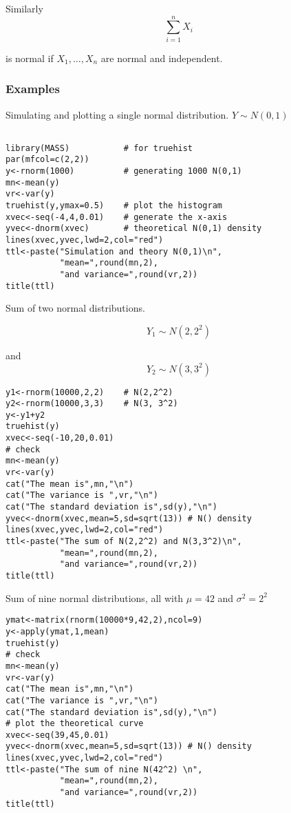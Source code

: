 \documentclass[12pt,a4paper]{article}
\theoremstyle{regla}
\theoremstyle{remark}
\theoremstyle{definition}
\theoremstyle{nonumberbreak}
\begin{document}
Similarly $$\sum_{i=1}^{n} X_i $$

is normal if $X_1 , \ldots , X_n$ are normal and independent.
\subsubsection{Examples}
\begin{xmpl}
Simulating and plotting a single normal distribution.
$Y \sim N(0,1)$

\begin{lstlisting}

library(MASS)           # for truehist
par(mfcol=c(2,2))       
y<-rnorm(1000)          # generating 1000 N(0,1)
mn<-mean(y)
vr<-var(y)
truehist(y,ymax=0.5)    # plot the histogram
xvec<-seq(-4,4,0.01)    # generate the x-axis
yvec<-dnorm(xvec)       # theoretical N(0,1) density
lines(xvec,yvec,lwd=2,col="red")
ttl<-paste("Simulation and theory N(0,1)\n",
           "mean=",round(mn,2),
           "and variance=",round(vr,2))
title(ttl)
\end{lstlisting}
\end{xmpl}
\begin{xmpl}

Sum of two normal distributions.

$$Y_1 \sim N(2, 2^2)$$

and  $$Y_2 \sim N(3, 3^2)$$

\begin{lstlisting}
y1<-rnorm(10000,2,2)    # N(2,2^2)
y2<-rnorm(10000,3,3)    # N(3, 3^2)
y<-y1+y2
truehist(y)
xvec<-seq(-10,20,0.01)
# check
mn<-mean(y)
vr<-var(y)
cat("The mean is",mn,"\n")
cat("The variance is ",vr,"\n")
cat("The standard deviation is",sd(y),"\n")
yvec<-dnorm(xvec,mean=5,sd=sqrt(13)) # N() density
lines(xvec,yvec,lwd=2,col="red")
ttl<-paste("The sum of N(2,2^2) and N(3,3^2)\n",
           "mean=",round(mn,2),
           "and variance=",round(vr,2))
title(ttl)
\end{lstlisting}
\end{xmpl}
\begin{xmpl}
Sum of nine normal distributions, all with $\mu = 42$ and $\sigma^2=2^2$


\begin{lstlisting}
ymat<-matrix(rnorm(10000*9,42,2),ncol=9)
y<-apply(ymat,1,mean)
truehist(y)
# check
mn<-mean(y)
vr<-var(y)
cat("The mean is",mn,"\n")
cat("The variance is ",vr,"\n")
cat("The standard deviation is",sd(y),"\n")
# plot the theoretical curve
xvec<-seq(39,45,0.01)
yvec<-dnorm(xvec,mean=5,sd=sqrt(13)) # N() density
lines(xvec,yvec,lwd=2,col="red")
ttl<-paste("The sum of nine N(42^2) \n",
           "mean=",round(mn,2),
           "and variance=",round(vr,2))
title(ttl)
\end{lstlisting}
\end{xmpl}
\end{document}
